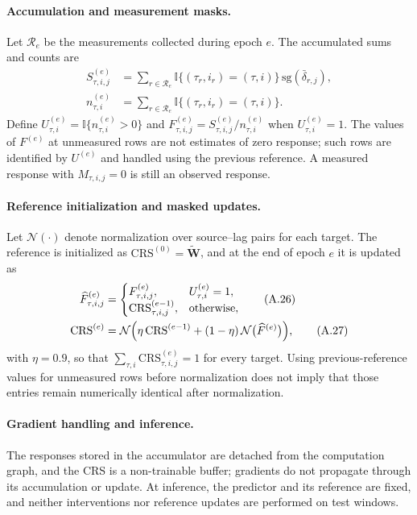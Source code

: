 \documentclass[letterpaper]{article}
\newcommand{\Wt}{\widetilde{\mathbf{W}}}
\newcommand{\CRS}{\mathrm{CRS}}
\begin{document}
\paragraph{Accumulation and measurement masks.}
Let $\mathcal{R}_e$ be the measurements collected during epoch $e$. The accumulated sums and counts are
\begin{align}
S^{(e)}_{\tau,i,j}&=\sum_{r\in\mathcal{R}_e}\mathbb{I}\{(\tau_r,i_r)=(\tau,i)\}\,\mathrm{sg}(\bar{\delta}_{r,j}), \tag{A.24}\\
n^{(e)}_{\tau,i}&=\sum_{r\in\mathcal{R}_e}\mathbb{I}\{(\tau_r,i_r)=(\tau,i)\}. \tag{A.25}
\end{align}
Define $U^{(e)}_{\tau,i}=\mathbb{I}\{n^{(e)}_{\tau,i}>0\}$ and $F^{(e)}_{\tau,i,j}=S^{(e)}_{\tau,i,j}/n^{(e)}_{\tau,i}$ when $U^{(e)}_{\tau,i}=1$. The values of $F^{(e)}$ at unmeasured rows are not estimates of zero response; such rows are identified by $U^{(e)}$ and handled using the previous reference. A measured response with $M_{\tau,i,j}=0$ is still an observed response.

\paragraph{Reference initialization and masked updates.}
Let $\mathcal{N}(\cdot)$ denote normalization over source--lag pairs for each target. The reference is initialized as $\CRS^{(0)}=\Wt$, and at the end of epoch $e$ it is updated as
\begin{align}
\widehat{F}^{(e)}_{\tau,i,j}&=\begin{cases}F^{(e)}_{\tau,i,j}, & U^{(e)}_{\tau,i}=1,\\ \CRS^{(e-1)}_{\tau,i,j}, & \text{otherwise},\end{cases} \tag{A.26}\\
\CRS^{(e)}&=\mathcal{N}\Bigl(\eta\,\CRS^{(e-1)}+(1-\eta)\,\mathcal{N}\bigl(\widehat{F}^{(e)}\bigr)\Bigr), \tag{A.27}
\end{align}
with $\eta=0.9$, so that $\sum_{\tau,i}\CRS^{(e)}_{\tau,i,j}=1$ for every target. Using previous-reference values for unmeasured rows before normalization does not imply that those entries remain numerically identical after normalization.

\paragraph{Gradient handling and inference.}
The responses stored in the accumulator are detached from the computation graph, and the CRS is a non-trainable buffer; gradients do not propagate through its accumulation or update. At inference, the predictor and its reference are fixed, and neither interventions nor reference updates are performed on test windows.
\end{document}
